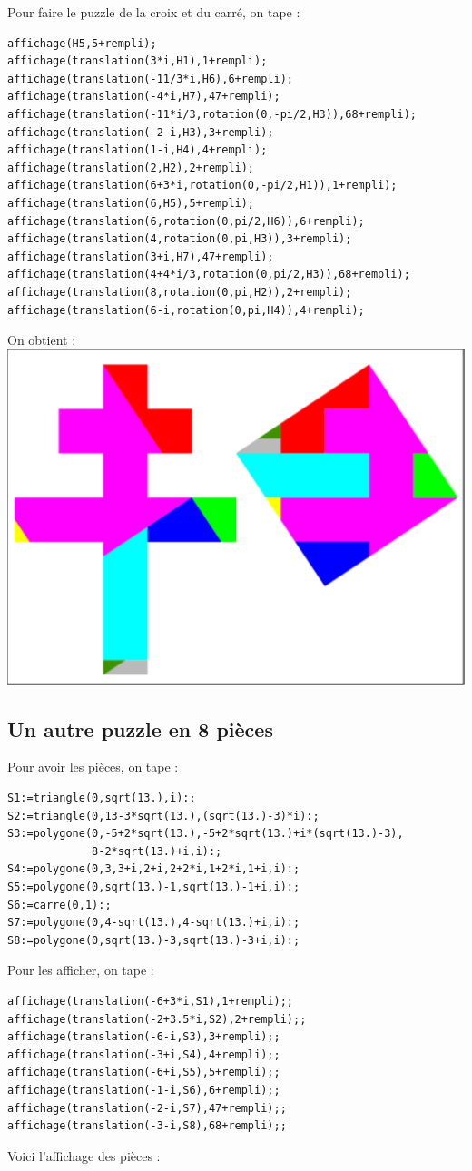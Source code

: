 \documentclass[a4paper,11pt]{book}
\begin{document}
Pour faire le puzzle de la croix et du carr\'e, on tape :
\begin{verbatim}
affichage(H5,5+rempli);
affichage(translation(3*i,H1),1+rempli);
affichage(translation(-11/3*i,H6),6+rempli);
affichage(translation(-4*i,H7),47+rempli);
affichage(translation(-11*i/3,rotation(0,-pi/2,H3)),68+rempli);
affichage(translation(-2-i,H3),3+rempli);
affichage(translation(1-i,H4),4+rempli);
affichage(translation(2,H2),2+rempli);
affichage(translation(6+3*i,rotation(0,-pi/2,H1)),1+rempli);
affichage(translation(6,H5),5+rempli);
affichage(translation(6,rotation(0,pi/2,H6)),6+rempli);
affichage(translation(4,rotation(0,pi,H3)),3+rempli);
affichage(translation(3+i,H7),47+rempli);
affichage(translation(4+4*i/3,rotation(0,pi/2,H3)),68+rempli);
affichage(translation(8,rotation(0,pi,H2)),2+rempli);
affichage(translation(6-i,rotation(0,pi,H4)),4+rempli);
\end{verbatim}
On obtient :\\
\includegraphics[width=\textwidth]{puzzlecroix17}
\subsection{Un autre puzzle en 8 pi\`eces}
Pour avoir les  pi\`eces, on tape :
\begin{verbatim}
S1:=triangle(0,sqrt(13.),i):;
S2:=triangle(0,13-3*sqrt(13.),(sqrt(13.)-3)*i):;
S3:=polygone(0,-5+2*sqrt(13.),-5+2*sqrt(13.)+i*(sqrt(13.)-3),
             8-2*sqrt(13.)+i,i):;
S4:=polygone(0,3,3+i,2+i,2+2*i,1+2*i,1+i,i):;
S5:=polygone(0,sqrt(13.)-1,sqrt(13.)-1+i,i):;
S6:=carre(0,1):;
S7:=polygone(0,4-sqrt(13.),4-sqrt(13.)+i,i):; 
S8:=polygone(0,sqrt(13.)-3,sqrt(13.)-3+i,i):;
\end{verbatim}
Pour les afficher, on tape :
\begin{verbatim}
affichage(translation(-6+3*i,S1),1+rempli);;
affichage(translation(-2+3.5*i,S2),2+rempli);;
affichage(translation(-6-i,S3),3+rempli);;
affichage(translation(-3+i,S4),4+rempli);;
affichage(translation(-6+i,S5),5+rempli);;
affichage(translation(-1-i,S6),6+rempli);;
affichage(translation(-2-i,S7),47+rempli);;
affichage(translation(-3-i,S8),68+rempli);;
\end{verbatim}
Voici l'affichage des pi\`eces :\\
\end{document}
